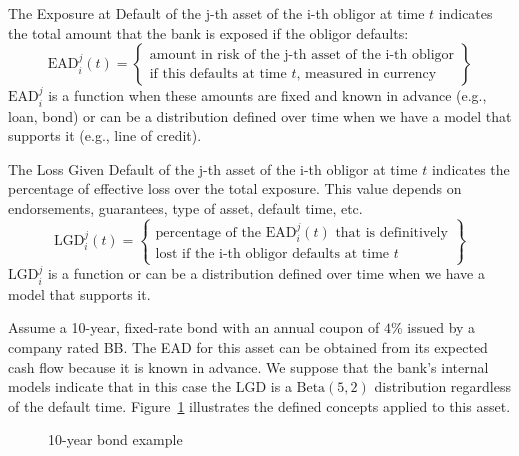 \documentclass[11pt,fleqn]{book} %
\begin{document}
\begin{definition}
	The Exposure at Default of the j-th asset of the i-th obligor at time $t$
	indicates the total amount that the bank is exposed if the obligor defaults:
	\begin{displaymath}
		\text{EAD}_i^j(t) = \left\{
		\begin{array}{c}
			\text{amount in risk of the j-th asset of the i-th obligor} \\
			\text{if this defaults at time $t$, measured in currency}
		\end{array}
		\right\}
	\end{displaymath}
	$\text{EAD}_i^j$ is a function when these amounts are fixed and known in 
	advance (e.g., loan, bond) or can be a distribution defined over time when 
	we have a model that supports it (e.g., line of credit).
\end{definition}

\begin{definition}
	The Loss Given Default of the j-th asset of the i-th obligor at time $t$ 
	indicates the percentage of effective loss over the total exposure. This
	value depends on endorsements, guarantees, type of asset, default time, etc.
	\begin{displaymath}
		\text{LGD}_i^j(t) = \left\{
		\begin{array}{c}
			\text{percentage of the $\text{EAD}_i^j(t)$ that is definitively} \\
			\text{lost if the i-th obligor defaults at time $t$}
		\end{array}
		\right\}
	\end{displaymath}
	$\text{LGD}_i^j$ is a function or can be a distribution defined over 
	time when we have a model that supports it. 
\end{definition}

\begin{example}
	Assume a 10-year, fixed-rate bond with an annual coupon of $4\%$ issued 
	by a company rated BB\@. The EAD for this asset can be obtained from its 
	expected cash flow because it is known in advance. We suppose that the 
	bank's internal models indicate that in this case the LGD is a 
	$\text{Beta}(5,2)$ distribution regardless of the default time.
	Figure~\ref{figure:bond} illustrates the defined concepts applied 
	to this asset.
\end{example}

\begin{figure}[!ht]
	\centering
	\caption{10-year bond example}
	\label{figure:bond} 
\end{figure}
\end{document}
